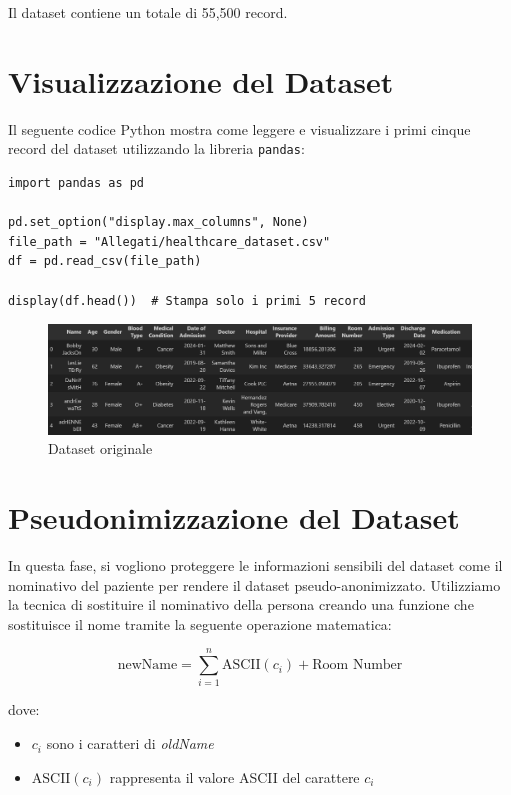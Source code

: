 Il dataset contiene un totale di 55,500 record.

\section{Visualizzazione del Dataset}

Il seguente codice Python mostra come leggere e visualizzare i primi cinque record del dataset utilizzando la libreria \texttt{pandas}:\\

\begin{lstlisting}[caption={Visualizzazione dataset}]
import pandas as pd

pd.set_option("display.max_columns", None)  
file_path = "Allegati/healthcare_dataset.csv"
df = pd.read_csv(file_path)

display(df.head())  # Stampa solo i primi 5 record
\end{lstlisting}

\begin{figure}[H]
    \centering
    \includegraphics[width=1.0\linewidth]{Images/Img1.png}
    \caption{Dataset originale}
\end{figure}

\section{Pseudonimizzazione del Dataset}

In questa fase, si vogliono proteggere le informazioni sensibili del dataset come il nominativo del paziente per rendere il dataset pseudo-anonimizzato. Utilizziamo la tecnica di sostituire il nominativo della persona creando una funzione che sostituisce il nome tramite la seguente operazione matematica:

\[
\text{newName} = \sum_{i=1}^{n} \text{ASCII}(c_i) + \text{Room Number}
\]

dove:

\begin{itemize}
    \item \(c_i\) sono i caratteri di \textit{oldName}
    \item \(\text{ASCII}(c_i)\) rappresenta il valore ASCII del carattere \(c_i\)
\end{itemize}

